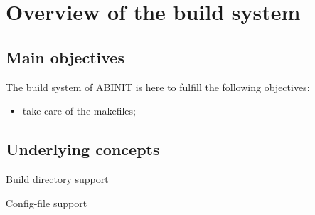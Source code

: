 
\chapter{Overview of the build system}


\section{Main objectives}

The build system of ABINIT is here to fulfill the following objectives: 
\begin{itemize}
\item take care of the makefiles; 
\end{itemize}

\section{Underlying concepts}

Build directory support

Config-file support
